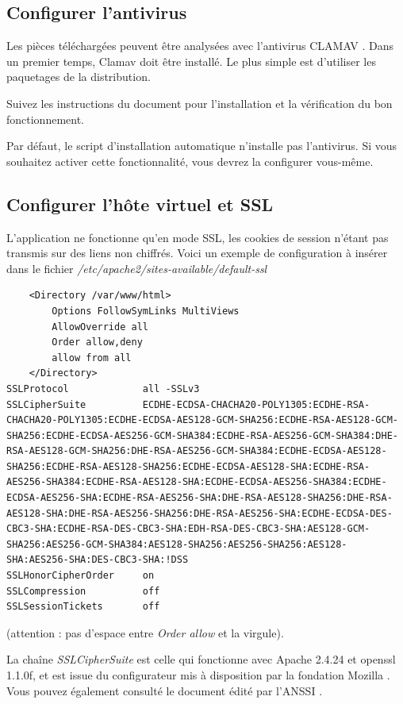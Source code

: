 \subsection{Configurer l'antivirus}
Les pièces téléchargées peuvent être analysées avec l'antivirus CLAMAV \cite{clamav}. Dans un premier temps, Clamav doit être installé. Le plus simple est d'utiliser les paquetages de la distribution.

Suivez les instructions du document \cite{clamavarchlinux} pour l'installation et la vérification du bon fonctionnement.

Par défaut, le script d'installation automatique n'installe pas l'antivirus. Si vous souhaitez activer cette fonctionnalité, vous devrez la configurer vous-même.

\subsection{Configurer l'hôte virtuel et SSL}
L'application ne fonctionne qu'en mode SSL, les cookies de session n'étant pas transmis sur des liens non chiffrés. Voici un exemple de configuration à insérer dans le fichier \textit{/etc/apache2/sites-available/default-ssl}
\begin{lstlisting}
    <Directory /var/www/html>
        Options FollowSymLinks MultiViews
        AllowOverride all
        Order allow,deny
        allow from all
    </Directory>
SSLProtocol             all -SSLv3
SSLCipherSuite          ECDHE-ECDSA-CHACHA20-POLY1305:ECDHE-RSA-CHACHA20-POLY1305:ECDHE-ECDSA-AES128-GCM-SHA256:ECDHE-RSA-AES128-GCM-SHA256:ECDHE-ECDSA-AES256-GCM-SHA384:ECDHE-RSA-AES256-GCM-SHA384:DHE-RSA-AES128-GCM-SHA256:DHE-RSA-AES256-GCM-SHA384:ECDHE-ECDSA-AES128-SHA256:ECDHE-RSA-AES128-SHA256:ECDHE-ECDSA-AES128-SHA:ECDHE-RSA-AES256-SHA384:ECDHE-RSA-AES128-SHA:ECDHE-ECDSA-AES256-SHA384:ECDHE-ECDSA-AES256-SHA:ECDHE-RSA-AES256-SHA:DHE-RSA-AES128-SHA256:DHE-RSA-AES128-SHA:DHE-RSA-AES256-SHA256:DHE-RSA-AES256-SHA:ECDHE-ECDSA-DES-CBC3-SHA:ECDHE-RSA-DES-CBC3-SHA:EDH-RSA-DES-CBC3-SHA:AES128-GCM-SHA256:AES256-GCM-SHA384:AES128-SHA256:AES256-SHA256:AES128-SHA:AES256-SHA:DES-CBC3-SHA:!DSS
SSLHonorCipherOrder     on
SSLCompression          off
SSLSessionTickets       off

\end{lstlisting}

(attention : pas d'espace entre \textit{Order allow} et la virgule).

La chaîne \textit{SSLCipherSuite} est celle qui fonctionne avec Apache 2.4.24 et openssl 1.1.0f, et est issue du configurateur mis à disposition par la fondation Mozilla \cite{mozillagenerator}. 
Vous pouvez également consulté le document édité par l'ANSSI \cite{tls}. 

